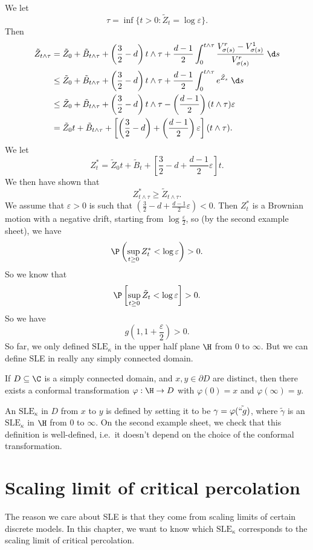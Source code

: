 \documentclass[a4paper]{article}
\newcommand\SLE{\mathrm{SLE}}
\begin{document}
We let
\[
  \tau = \inf \{t > 0 : \tilde{Z}_t = \log \varepsilon\}.
\]
Then
\begin{align*}
  \tilde{Z}_{t \wedge \tau} &= \tilde{Z}_0 + \tilde{B}_{t \wedge \tau} + \left(\frac{3}{2} - d\right) t\wedge \tau + \frac{d - 1}{2} \int_0^{t \wedge \tau} \frac{V_{\sigma(s)}^r - V_{\sigma(s)}^1}{V_{\sigma(s)}^r}\;\d s\\
  &\leq \tilde{Z}_0 + \tilde{B}_{t \wedge \tau} + \left(\frac{3}{2} - d \right) t \wedge \tau + \frac{d - 1}{2} \int_0^{t \wedge \tau} e^{\tilde{Z}_s}\;\d s\\
  &\leq \tilde{Z}_0 + \tilde{B}_{t \wedge \tau} + \left(\frac{3}{2} - d \right) t \wedge \tau - \left(\frac{d - 1}{2}\right)(t \wedge \tau)\varepsilon\\
  &= \tilde{Z}_0t + \tilde{B}_{t \wedge \tau} + \left[\left(\frac{3}{2} - d\right) + \left(\frac{d - 1}{2}\right)\varepsilon \right] (t \wedge \tau).
\end{align*}
We let
\[
  Z_t^*= \tilde{Z}_0t + \tilde{B}_{t} + \left[\frac{3}{2} - d + \frac{d - 1}{2}\varepsilon \right] t.
\]
We then have shown that
\[
  Z_{t \wedge \tau}^* \geq \tilde{Z}_{t \wedge \tau}.
\]
We assume that $\varepsilon > 0$ is such that $\left(\frac{3}{2} - d + \frac{d - 1}{2} \varepsilon\right) < 0$. Then $Z_t^*$ is a Brownian motion with a negative drift, starting from $\log \frac{\varepsilon}{2}$, so (by the second example sheet), we have
\[
  \P \left(\sup_{t \geq 0} Z_t^* < \log \varepsilon\right) > 0.
\]
So we know that
\[
  \P\left[ \sup_{t \geq 0} \tilde{Z}_t < \log \varepsilon \right] > 0.
\]
So we have
\[
  g\left(1, 1 + \frac{\varepsilon}{2}\right) > 0.
\]
So far, we only defined $\SLE_\kappa$ in the upper half plane $\H$ from $0$ to $\infty$. But we can define SLE in really any simply connected domain.

If $D \subseteq \C$ is a simply connected domain, and $x, y \in \partial D$ are distinct, then there exists a conformal transformation $\varphi: \H \to D$ with $\varphi(0) = x$ and $\varphi(\infty) = y$.

An $\SLE_\kappa$ in $D$ from $x$ to $y$ is defined by setting it to be $\gamma = \varphi(\tilde{``g})$, where $\tilde{\gamma}$ is an $\SLE_\kappa$ in $\H$ from $0$ to $\infty$. On the second example sheet, we check that this definition is well-defined, i.e.\ it doesn't depend on the choice of the conformal transformation.
\section{Scaling limit of critical percolation}
The reason we care about SLE is that they come from scaling limits of certain discrete models. In this chapter, we want to know which $\SLE_\kappa$ corresponds to the scaling limit of critical percolation.
\end{document}
